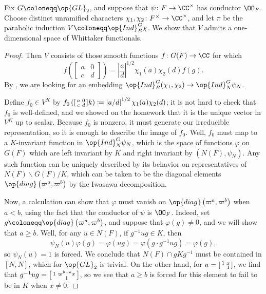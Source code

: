 \documentclass[../notes.tex]{subfiles}
\begin{document}
\begin{exe} \label{exe:whittaker-for-unr-induction}
	Fix $G\coloneqq\op{GL}_2$, and suppose that $\psi\colon F\to\CC^\times$ has conductor $\OO_F$. Choose distinct unramified characters $\chi_1,\chi_2\colon F^\times\to\CC^\times$, and let $\pi$ be the parabolic induction $V\coloneqq\op{Ind}_B^G\chi$. We show that $V$ admits a one-dimensional space of Whittaker functionals.
\end{exe}
\begin{proof}
	Then $V$ consists of those smooth functions $f\colon G(F)\to\CC$ for which
	\[f\left(\begin{bmatrix}
		a & 0 \\ c & d
	\end{bmatrix}\right)=\left|\frac ad\right|^{1/2}\chi_1(a)\chi_2(d)f(g).\]
	By , we are looking for an embedding $\op{Ind}_B^G(\chi_1,\chi_2)\to\op{Ind}_N^G\psi_N$.
	
	Define $f_0\in V^K$ by $f_0\left(\begin{bsmallmatrix}
		a & 0 \\ c & d
	\end{bsmallmatrix}k\right)\coloneqq\left|a/d\right|^{1/2}\chi_1(a)\chi_2(d)$; it is not hard to check that $f_0$ is well-defined, and we showed on the homework that it is the unique vector in $V^K$ up to scalar. Because $f_0$ is nonzero, it must generate our irreducible representation, so it is enough to describe the image of $f_0$. Well, $f_0$ must map to a $K$-invariant function in $\op{Ind}_N^G\psi_N$, which is the space of functions $\varphi$ on $G(F)$ which are left invariant by $K$ and right invariant by $(N(F),\psi_N)$. Any such function can be uniquely described by its behavior on representatives of $N(F)\backslash G(F)/K$, which can be taken to be the diagonal elements $\op{diag}\left(\varpi^a,\varpi^b\right)$ by the Iwasawa decomposition.

	Now, a calculation can show that $\varphi$ must vanish on $\op{diag}\left(\varpi^a,\varpi^b\right)$ when $a<b$, using the fact that the conductor of $\psi$ is $\OO_F$. Indeed, set $g\coloneqq\op{diag}\left(\varpi^a,\varpi^b\right)$, and suppose that $\varphi(g)\ne0$, and we will show that $a\ge b$. Well, for any $u\in N(F)$, if $g^{-1}ug\in K$, then
	\[\psi_N(u)\varphi(g)=\varphi(ug)=\varphi\left(g\cdot g^{-1}ug\right)=\varphi(g),\]
	so $\psi_N(u)=1$ is forced. We conclude that $N(F)\cap gKg^{-1}$ must be contained in $[N,N]$, which for $\op{GL}_2$ is trivial. On the other hand, for $u=\begin{bsmallmatrix}
		1 & x \\ & 1
	\end{bsmallmatrix}$, we find that $g^{-1}ug=\begin{bsmallmatrix}
		1 & \varpi^{b-a}x \\ & 1
	\end{bsmallmatrix}$, so we see that $a\ge b$ is forced for this element to fail to be in $K$ when $x\ne0$.


\end{proof}
\end{document}
